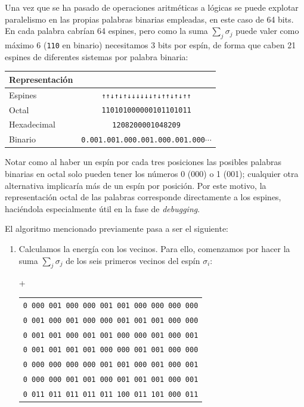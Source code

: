 \documentclass[11pt]{report}
\begin{document}
\begin{appendices}
Una vez que se ha pasado de operaciones aritméticas a lógicas se
puede explotar paralelismo en las propias palabras binarias
empleadas, en este caso de 64 bits. En cada palabra cabrían 64
espines, pero como la suma $\sum_{j}σ_j$ puede valer como máximo 6
(\texttt{110} en binario) necesitamos 3 bits por espín, de forma que caben 21
espines de diferentes sistemas por
palabra binaria\footnotemark:


\begin{center}
  \begin{tabular}{l|c}
    Representación &                                                \\ \hline
    Espines        & \texttt{↑↑↓↑↓↑↓↓↓↓↓↓↑↓↑↑↓↑↓↑↑}                 \\
    Octal          & \texttt{110101000000101101011}                 \\
    Hexadecimal    & \texttt{1208200001048209}                      \\
    Binario        & \texttt{0.001.001.000.001.000.001.000}$\cdots$ \\
  \end{tabular}
\end{center}


Notar como al haber un espín por cada tres posiciones las posibles
palabras binarias en octal solo pueden tener los números 0 (000) o 1
(001); cualquier otra alternativa implicaría más de un espín por
posición. Por este motivo, la representación octal de las palabras
corresponde directamente a los espines, haciéndola especialmente útil
en la fase de \textit{debugging}.


El algoritmo mencionado previamente pasa a ser el siguiente:
\begin{enumerate}
\item Calculamos la energía con los vecinos. Para ello, comenzamos por
  hacer la suma $\sum_{j}σ_j$ de los seis primeros vecinos del espín $σ_i$:

  \begin{minipage}[lc]{1.0\linewidth}
    +
    \begin{tabular}{l}
     \texttt{0 000 001 000 000 001 001 000 000 000 000} \\
     \texttt{0 001 000 001 000 000 001 001 001 000 000} \\
     \texttt{0 001 001 000 001 001 000 000 001 000 001} \\
     \texttt{0 001 001 001 001 000 000 001 001 000 000} \\
     \texttt{0 000 000 000 000 001 001 000 001 000 001} \\
     \texttt{0 000 000 001 001 000 001 001 001 000 001} \\ \hline
     \texttt{0 011 011 011 011 011 100 011 101 000 011} \\
    \end{tabular}
  \end{minipage}


\end{enumerate}
\end{appendices}
\end{document}
